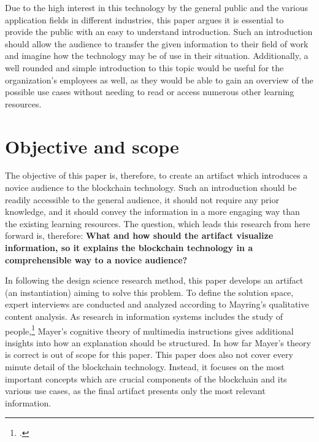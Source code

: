 Due to the high interest in this technology by the general public and the various application fields in different industries, this paper argues it is essential to provide the public with an easy to understand introduction. Such an introduction should allow the audience to transfer the given information to their field of work and imagine how the technology may be of use in their situation. %
Additionally, a well rounded and simple introduction to this topic would be useful for the organization's employees as well, as they would be able to gain an overview of the possible use cases without needing to read or access numerous other learning resources.

\section{Objective and scope} \label{sec:Objective}

The objective of this paper is, therefore, to create an artifact which introduces a novice audience to the blockchain technology. Such an introduction should be readily accessible to the general audience, it should not require any prior knowledge, and it should convey the information in a more engaging way than the existing learning resources. The question, which leads this research from here forward is, therefore: \textbf{What and how should the artifact visualize information, so it explains the blockchain technology in a comprehensible way to a novice audience?}

In following the design science research method, this paper develops an artifact (an instantiation) aiming to solve this problem. To define the solution space, expert interviews are conducted and analyzed according to Mayring's qualitative content analysis. As research in information systems includes the study of people,\footcite[Cf.][p.11]{OsterleGestaltungsorientierteWirtschaftsinformatikPladoyer2010} Mayer's cognitive theory of multimedia instructions gives additional insights into how an explanation should be structured. In how far Mayer's theory is correct is out of scope for this paper. This paper does also not cover every minute detail of the blockchain technology. Instead, it focuses on the most important concepts which are crucial components of the blockchain and its various use cases, as the final artifact presents only the most relevant information.
    
